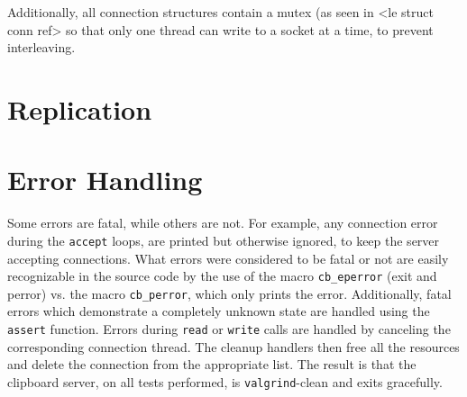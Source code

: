 \documentclass[a4paper, titlepage, english]{article}
\begin{document}
	\par
	Additionally, all connection structures contain a mutex (as seen in <le struct conn ref> so that only one thread can write to a socket at a time, to prevent interleaving.

	\section{Replication}

	\section{Error Handling}
	\par
	Some errors are fatal, while others are not. For example, any connection error during the \texttt{accept} loops, are printed but otherwise ignored, to keep the server accepting connections. What errors were considered to be fatal or not are easily recognizable in the source code by the use of the macro \texttt{cb\_eperror} (exit and perror) vs. the macro \texttt{cb\_perror}, which only prints the error. Additionally, fatal errors which demonstrate a completely unknown state are handled using the \texttt{assert} function. Errors during \texttt{read} or \texttt{write} calls are handled by canceling the corresponding connection thread. The cleanup handlers then free all the resources and delete the connection from the appropriate list. The result is that the clipboard server, on all tests performed, is \texttt{valgrind}-clean and exits gracefully.



\end{document}

